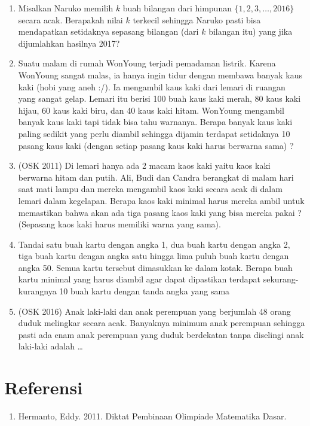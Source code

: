 \documentclass[11pt]{scrartcl}
\begin{document}
\begin{enumerate}
                \item Misalkan Naruko memilih $k$ buah bilangan dari himpunan $\{1,2,3,\dots,2016\}$ secara acak. Berapakah nilai $k$ terkecil sehingga Naruko pasti bisa mendapatkan setidaknya sepasang bilangan (dari $k$ bilangan itu) yang jika dijumlahkan hasilnya 2017?
                
                \item Suatu malam di rumah WonYoung terjadi pemadaman listrik. Karena WonYoung sangat malas, ia hanya ingin tidur dengan membawa banyak kaus kaki (hobi yang aneh :/). Ia mengambil kaus kaki dari lemari di ruangan yang sangat gelap. Lemari itu berisi 100 buah kaus kaki merah, 80 kaus kaki hijau, 60 kaus kaki biru, dan 40 kaus kaki hitam. WonYoung mengambil banyak kaus kaki tapi tidak bisa tahu warnanya. Berapa banyak kaus kaki paling sedikit yang perlu diambil sehingga dijamin terdapat setidaknya 10 pasang kaus kaki (dengan setiap pasang kaus kaki harus berwarna sama) ?
                
                \item (OSK 2011) Di lemari hanya ada 2 macam kaos kaki yaitu kaos kaki berwarna hitam dan putih. 
            Ali, Budi dan Candra berangkat di malam hari saat mati lampu dan mereka mengambil kaos kaki 
            secara acak di dalam lemari dalam kegelapan. Berapa kaos kaki minimal harus mereka ambil untuk 
            memastikan bahwa akan ada tiga pasang kaos kaki yang bisa mereka pakai ? (Sepasang kaos kaki harus 
            memiliki warna yang sama).
                
                \item Tandai satu buah kartu dengan angka 1, dua buah kartu dengan angka 2, tiga buah kartu dengan 
            angka satu hingga lima puluh buah kartu dengan angka 50. Semua kartu tersebut dimasukkan ke 
            dalam kotak. Berapa buah kartu minimal yang harus diambil agar dapat dipastikan terdapat sekurang-kurangnya 10 buah kartu dengan tanda angka yang sama 
            
                \item (OSK 2016)
            	Anak laki-laki dan anak perempuan yang berjumlah 48 orang duduk melingkar secara acak.
            Banyaknya minimum anak perempuan sehingga pasti ada enam anak perempuan yang duduk
            berdekatan tanpa diselingi anak laki-laki adalah \dots
        \end{enumerate}
    
    \section{Referensi}
        \begin{enumerate}
            \item Hermanto, Eddy. 2011. Diktat Pembinaan Olimpiade Matematika Dasar.
        \end{enumerate}
\end{document}
